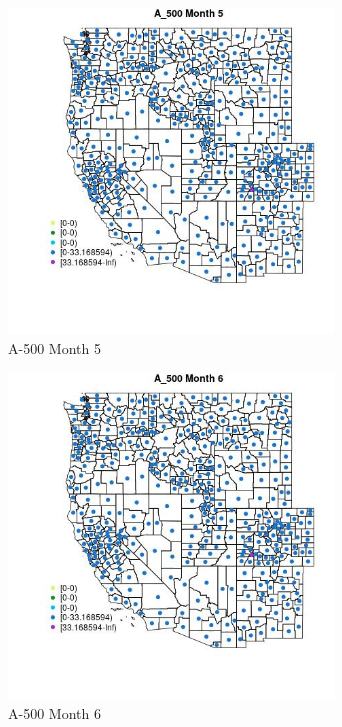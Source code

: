 \begin{figure} 
\centering  
\includegraphics[width=0.77\textwidth]{Code_Outputs/df_report_ML_predictors_CountyCentroid_Locations_Dates_2008-01-01to2018-12-31_MapObsMo5A_500.jpg} 
\caption{\label{fig:df_report_ML_predictors_CountyCentroid_Locations_Dates_2008-01-01to2018-12-31MapObsMo5A_500}A-500 Month 5} 
\end{figure} 
 

\begin{figure} 
\centering  
\includegraphics[width=0.77\textwidth]{Code_Outputs/df_report_ML_predictors_CountyCentroid_Locations_Dates_2008-01-01to2018-12-31_MapObsMo6A_500.jpg} 
\caption{\label{fig:df_report_ML_predictors_CountyCentroid_Locations_Dates_2008-01-01to2018-12-31MapObsMo6A_500}A-500 Month 6} 
\end{figure} 
 

